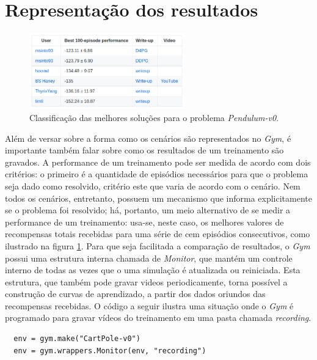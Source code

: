 \documentclass[cic,tc]{iiufrgs}
\begin{document}
\section{Representação dos resultados}

\begin{figure}[h]
    \caption{Classificação das melhores soluções para o problema
    \textit{Pendulum-v0}.}
    \begin{center}
      \includegraphics[width=0.6\textwidth]{leaderboard_best100.png}
    \end{center}
    \label{fig:leaderboard_best100}
\end{figure}

Além de versar sobre a forma como os cenários são representados no \textit{Gym},
é importante também falar sobre como os resultados de um treinamento são
gravados. A performance de um treinamento pode ser medida de acordo com dois
critérios: o primeiro é a quantidade de episódios necessários para que o
problema seja dado como resolvido, critério este que varia de acordo com o
cenário. Nem todos os cenários, entretanto, possuem um mecanismo que informa
explicitamente se o problema foi resolvido; há, portanto, um meio alternativo
de se medir a performance de um treinamento: usa-se, neste caso, os melhores
valores de recompensas totais recebidas para uma série de cem episódios
consecutivos, como ilustrado na figura \ref{fig:leaderboard_best100}.
Para que seja facilitada a comparação de resultados, o \textit{Gym} possui
uma estrutura interna chamada de \textit{Monitor}, que mantém um controle
interno de todas as vezes que o uma simulação é atualizada ou reiniciada. Esta
estrutura, que também pode gravar videos periodicamente, torna possível a
construção de curvas de aprendizado, a partir dos dados oriundos das
recompensas recebidas. O código a seguir ilustra uma situação onde o
\textit{Gym} é programado para gravar vídeos do treinamento em uma pasta chamada
\textit{recording}.

\begin{verbatim}
  env = gym.make("CartPole-v0")
  env = gym.wrappers.Monitor(env, "recording")
\end{verbatim}
\end{document}

